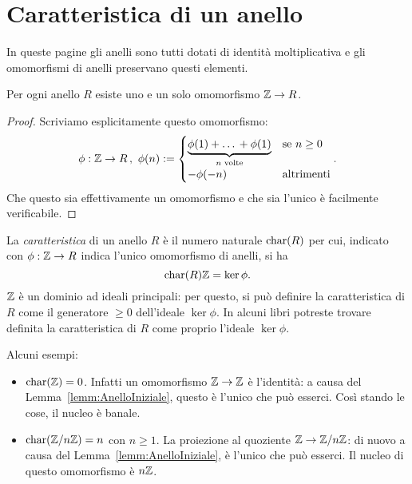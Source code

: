 
\section{Caratteristica di un anello}

In queste pagine gli anelli sono tutti dotati di identità moltiplicativa e gli omomorfismi di anelli preservano questi elementi. %

\begin{lemm}\label{lemm:AnelloIniziale}
Per ogni anello \(R\) esiste uno e un solo omomorfismo \(\mathbb{Z} \to R\).
\end{lemm}

\begin{proof}
Scriviamo esplicitamente questo omomorfismo:
\[\phi : \Z \to R \,,\ \phi(n) := \begin{cases} \underbrace{\phi(1) + \dots{} + \phi(1)}_{n \text{ volte}} & \text{se } n \ge 0 \\ -\phi(-n) & \text{altrimenti} \end{cases}.\]
Che questo sia effettivamente un omomorfismo e che sia l'unico è facilmente verificabile.
\end{proof}

\begin{defi}
La {\em caratteristica} di un anello \(R\) è il numero naturale \(\operatorname{char}(R)\) per cui, indicato con \(\phi : \mathbb{Z} \to R\) indica l'unico omomorfismo di anelli, si ha
\[\operatorname{char}(R)\mathbb{Z} = \ker \phi .\]
\(\mathbb{Z}\) è un dominio ad ideali principali: per questo, si può definire la caratteristica di \(R\) come il generatore \(\ge 0\) dell'ideale \(\ker \phi\). In alcuni libri potreste trovare definita la caratteristica di \(R\) come proprio l'ideale \(\ker \phi\).
\end{defi} 

\begin{esem}
Alcuni esempi:
\begin{itemize}
\item \(\operatorname{char}(\mathbb{Z}) = 0\). Infatti un omomorfismo \(\mathbb{Z} \to \mathbb{Z}\) è l'identità: a causa del Lemma~\ref{lemm:AnelloIniziale}, questo è l'unico che può esserci. Così stando le cose, il nucleo è banale.
\item \(\operatorname{char}(\mathbb{Z}/n\mathbb{Z})=n\) con \(n \ge 1\). La proiezione al quoziente \(\mathbb{Z} \to \mathbb{Z}/n\mathbb{Z}\): di nuovo a causa del Lemma~\ref{lemm:AnelloIniziale}, è l'unico che può esserci. Il nucleo di questo omomorfismo è \(n\mathbb{Z}\).
\end{itemize}
\end{esem}

